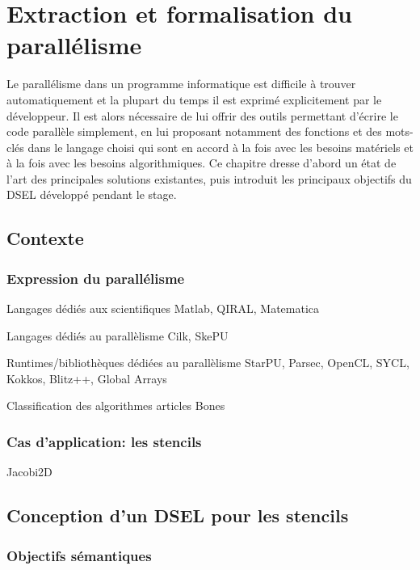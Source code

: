 
\chapter{Extraction et formalisation du parallélisme}

Le parallélisme dans un programme informatique est difficile à trouver automatiquement et la plupart du temps il est exprimé explicitement par le développeur. Il est alors nécessaire de lui offrir des outils permettant d'écrire le code parallèle simplement, en lui proposant notamment des fonctions et des mots-clés dans le langage choisi qui sont en accord à la fois avec les besoins matériels et à la fois avec les besoins algorithmiques. Ce chapitre dresse d'abord un état de l'art des principales solutions existantes, puis introduit les principaux objectifs du DSEL développé pendant le stage.

\section{Contexte}



\subsection{Expression du parallélisme}

Langages dédiés aux scientifiques Matlab, QIRAL, Matematica

Langages dédiés au parallèlisme Cilk, SkePU

Runtimes/bibliothèques dédiées au parallèlisme StarPU, Parsec, OpenCL, SYCL, Kokkos, Blitz++, Global Arrays

Classification des algorithmes articles Bones

\subsection{Cas d'application: les stencils}

Jacobi2D

\section{Conception d'un DSEL pour les stencils}

\subsection{Objectifs sémantiques}

